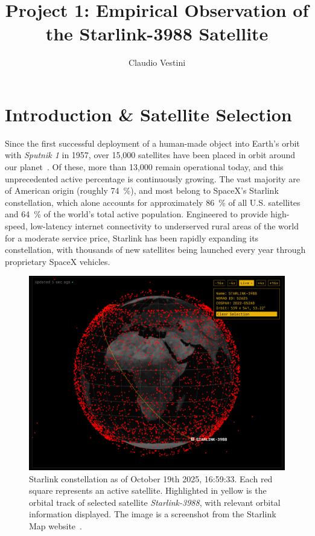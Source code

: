 \documentclass{article}
\title{Project 1: Empirical Observation of the Starlink-3988 Satellite}
\author{Claudio Vestini}
\begin{document}
\maketitle

\section{Introduction \& Satellite Selection} \label{sec:intro}

Since the first successful deployment of a human-made object into Earth's orbit with \textit{Sputnik 1} in 1957, over 15,000 satellites have been placed in orbit around our planet~\cite{lookup-lepoint2025}. Of these, more than 13,000 remain operational today, and this unprecedented active percentage is continuously growing. The vast majority are of American origin (roughly \SI{74}{\percent}), and most belong to SpaceX's Starlink constellation, which alone accounts for approximately \SI{86}{\percent} of all U.S. satellites and \SI{64}{\percent} of the world's total active population. Engineered to provide high-speed, low-latency internet connectivity to underserved rural areas of the world for a moderate service price, Starlink has been rapidly expanding its constellation, with thousands of new satellites being launched every year through proprietary SpaceX vehicles.

\begin{figure}[h!]
    \centering
    \includegraphics[width=\textwidth]{LaTeX/Figures/Starlink Constellation.png}
    \caption{Starlink constellation as of October 19th 2025, 16:59:33. Each red square represents an active satellite. Highlighted in yellow is the orbital track of selected satellite \textit{Starlink-3988}, with relevant orbital information displayed. The image is a screenshot from the Starlink Map website~\cite{starlinkmap.org}.}
    \label{fig:constellation}
\end{figure}
\end{document}
